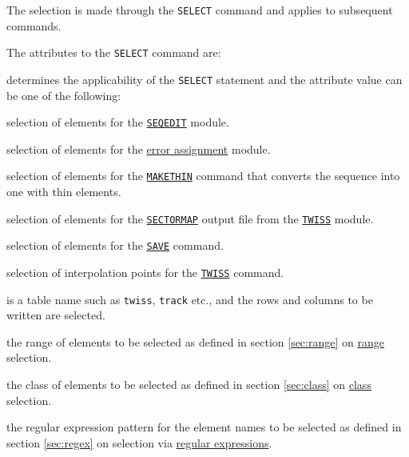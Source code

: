 The selection is made through the \texttt{SELECT} command and applies to
subsequent commands.


The attributes to the \texttt{SELECT} command are:
\begin{madlist}
   determines the applicability of the \texttt{SELECT}
  statement and the attribute value can be one of the following: 
  \begin{madlist}
     selection of elements for the
    \hyperref[sec:seqedit]{\texttt{SEQEDIT}} module.
    
     selection of elements for the
    \hyperref[chap:error]{error assignment} module.
    
     selection of elements for the
    \hyperref[chap:makethin]{\texttt{MAKETHIN}} command that
    converts the sequence into one with thin elements.
    
     selection of elements for the
    \hyperref[sec:sectormap]{\texttt{SECTORMAP}} output file
    from the \hyperref[chap:twiss]{\texttt{TWISS}} module.
    
     selection of elements for the
    \hyperref[sec:save]{\texttt{SAVE}} command.

     selection of interpolation points for the
    \hyperref[chap:twiss]{\texttt{TWISS}} command.

     is a table name such as \texttt{twiss}, 
    \texttt{track} etc., and the rows and columns to be written are
    selected.
  \end{madlist} 
  
   the range of elements to be selected as defined in
  section \ref{sec:range} on \hyperref[sec:range]{range} selection.

   the class of elements to be selected as defined in
  section \ref{sec:class} on \hyperref[sec:class]{class} selection.

   the regular expression pattern for the element names
  to be selected as defined in section \ref{sec:regex} on selection via
  \hyperref[sec:regex]{regular expressions}. 


\end{madlist}
